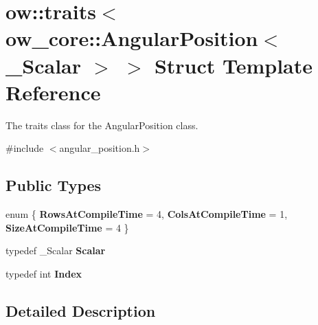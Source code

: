 \hypertarget{structow_1_1traits_3_01ow__core_1_1AngularPosition_3_01__Scalar_01_4_01_4}{}\section{ow\+:\+:traits$<$ ow\+\_\+core\+:\+:Angular\+Position$<$ \+\_\+\+Scalar $>$ $>$ Struct Template Reference}
\label{structow_1_1traits_3_01ow__core_1_1AngularPosition_3_01__Scalar_01_4_01_4}


The traits class for the Angular\+Position class.  




{\ttfamily \#include $<$angular\+\_\+position.\+h$>$}

\subsection*{Public Types}
\begin{DoxyCompactItemize}
\item 
enum \{ {\bfseries Rows\+At\+Compile\+Time} = 4, 
{\bfseries Cols\+At\+Compile\+Time} = 1, 
{\bfseries Size\+At\+Compile\+Time} = 4
 \}\hypertarget{structow_1_1traits_3_01ow__core_1_1AngularPosition_3_01__Scalar_01_4_01_4_a0a1fddeb6cecfbf5fd87834966b42be7}{}\label{structow_1_1traits_3_01ow__core_1_1AngularPosition_3_01__Scalar_01_4_01_4_a0a1fddeb6cecfbf5fd87834966b42be7}

\item 
typedef \+\_\+\+Scalar {\bfseries Scalar}\hypertarget{structow_1_1traits_3_01ow__core_1_1AngularPosition_3_01__Scalar_01_4_01_4_a60da6e19ead23abb59929fe5d59dc95d}{}\label{structow_1_1traits_3_01ow__core_1_1AngularPosition_3_01__Scalar_01_4_01_4_a60da6e19ead23abb59929fe5d59dc95d}

\item 
typedef int {\bfseries Index}\hypertarget{structow_1_1traits_3_01ow__core_1_1AngularPosition_3_01__Scalar_01_4_01_4_a72ab574eb75470babac74168eed80de7}{}\label{structow_1_1traits_3_01ow__core_1_1AngularPosition_3_01__Scalar_01_4_01_4_a72ab574eb75470babac74168eed80de7}

\end{DoxyCompactItemize}


\subsection{Detailed Description}
